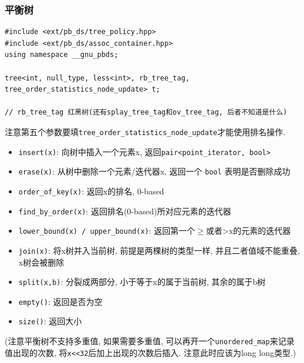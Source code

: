 \subsubsection{平衡树}

\begin{verbatim}
#include <ext/pb_ds/tree_policy.hpp>
#include <ext/pb_ds/assoc_container.hpp>
using namespace __gnu_pbds;

tree<int, null_type, less<int>, rb_tree_tag, tree_order_statistics_node_update> t;

// rb_tree_tag 红黑树(还有splay_tree_tag和ov_tree_tag, 后者不知道是什么)
\end{verbatim}

注意第五个参数要填\texttt{tree_order_statistics_node_update}才能使用排名操作.

\begin{itemize}
	\item \texttt{insert(x)}: 向树中插入一个元素x, 返回\texttt{pair<point_iterator, bool>}
	\item \texttt{erase(x)}: 从树中删除一个元素/迭代器x, 返回一个 \texttt{bool} 表明是否删除成功
	\item \texttt{order_of_key(x)}: 返回x的排名, 0-based
	\item \texttt{find_by_order(x)}: 返回排名(0-based)所对应元素的迭代器
	\item \texttt{lower_bound(x) / upper_bound(x)}: 返回第一个$\ge$或者>x的元素的迭代器
	\item \texttt{join(x)}: 将x树并入当前树, 前提是两棵树的类型一样, 并且二者值域不能重叠, x树会被删除
	\item \texttt{split(x,b)}: 分裂成两部分, 小于等于x的属于当前树, 其余的属于b树
	\item \texttt{empty()}: 返回是否为空
	\item \texttt{size()}: 返回大小
\end{itemize}

(注意平衡树不支持多重值, 如果需要多重值, 可以再开一个\texttt{unordered_map}来记录值出现的次数, 将\texttt{x<<32}后加上出现的次数后插入. 注意此时应该为long long类型.)